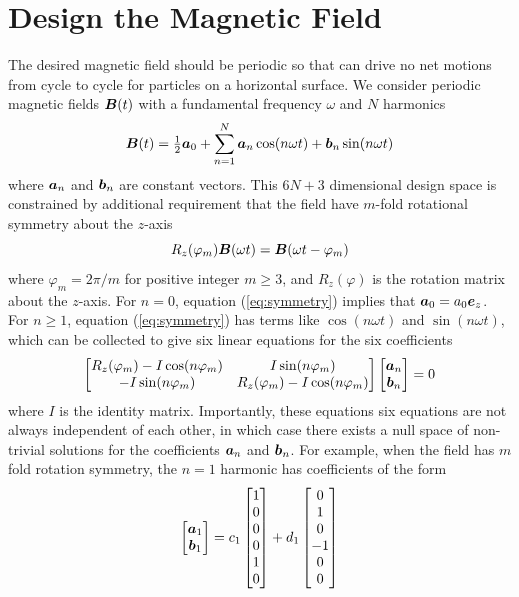 \section{Design the Magnetic Field}
The desired magnetic field should be periodic so that can drive no net motions from cycle to cycle for particles on a horizontal surface.
We consider periodic magnetic fields $\boldsymbol{B}(t)$ with a fundamental frequency $\omega$ and $N$ harmonics
\begin{equation}
    \boldsymbol{B}(t) = \tfrac{1}{2} \boldsymbol{a}_0 + \sum_{n=1}^N \boldsymbol{a}_n \cos(n\omega t) + \boldsymbol{b}_n \sin(n\omega t)
\end{equation}
where $\boldsymbol{a}_n$ and $\boldsymbol{b}_n$ are constant vectors. This $6N+3$ dimensional design space is constrained by additional requirement that the field have $m$-fold rotational symmetry about the $z$-axis
\begin{equation}
    R_z(\varphi_m) \boldsymbol{B}(\omega t) = \boldsymbol{B}(\omega t - \varphi_m) \label{eq:symmetry}
\end{equation}
where $\varphi_m=2\pi/m$ for positive integer $m\geq 3$, and $R_z(\varphi)$ is the rotation matrix about the $z$-axis.
For $n=0$, equation (\ref{eq:symmetry}) implies that $\boldsymbol{a}_0 = a_0 \boldsymbol{e}_z$. For $n\geq1$, equation (\ref{eq:symmetry}) has terms like $\cos(n \omega t)$ and $\sin(n\omega t)$, which can be collected to give six linear equations for the six coefficients 
\begin{equation}
    \begin{bmatrix} 
    R_z(\varphi_m) - I \cos(n\varphi_m) & I \sin(n \varphi_m) \\
    -I \sin(n \varphi_m) & R_z(\varphi_m) - I \cos(n\varphi_m)
    \end{bmatrix} 
    \begin{bmatrix} \boldsymbol{a}_n \\ \boldsymbol{b}_n \end{bmatrix} = 0
\end{equation}
where $I$ is the identity matrix.  Importantly, these equations six equations are not always independent of each other, in which case there exists a null space of non-trivial solutions for the coefficients $\boldsymbol{a}_n$ and $\boldsymbol{b}_n$.  For example, when the field has $m$ fold rotation symmetry, the $n=1$ harmonic has coefficients of the form 
\begin{equation}
    \begin{bmatrix} \boldsymbol{a}_1 \\ \boldsymbol{b}_1 \end{bmatrix} = c_1 \begin{bmatrix} 1\\0\\0\\0\\1\\0 \end{bmatrix} + d_1 \begin{bmatrix} 0\\1\\0\\-1\\0\\0 \end{bmatrix}
\end{equation}
